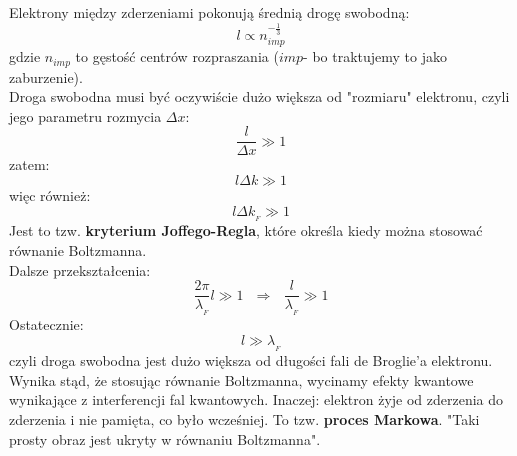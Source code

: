Elektrony między zderzeniami pokonują średnią drogę swobodną:
\begin{equation}l \propto n^{-\frac{1}{3}}_{imp} \end{equation}
gdzie $n_{imp}$ to gęstość centrów rozpraszania ($imp$- bo traktujemy to jako zaburzenie).\\
Droga swobodna musi być oczywiście dużo większa od "rozmiaru" elektronu, czyli jego parametru rozmycia $\Delta x$:
\begin{equation}\frac{l}{\Delta x}\gg 1\end{equation}
zatem:
\begin{equation}l\Delta k \gg 1\end{equation}
więc również:
\begin{equation}l\Delta k_{_F} \gg 1\end{equation}
Jest to tzw.\textbf{ kryterium Joffego-Regla}, które określa kiedy można stosować równanie Boltzmanna.\\
Dalsze przekształcenia:
\begin{equation}\frac{2\pi}{\lambda_{_F}}l\gg 1~~~ \Rightarrow~~~ \frac{l}{\lambda_{_F}}\gg 1\end{equation}
Ostatecznie:
\begin{equation}l \gg \lambda_{_F}\end{equation}
czyli droga swobodna jest dużo większa od długości fali de Broglie'a elektronu. Wynika stąd, że stosując równanie Boltzmanna, wycinamy efekty kwantowe wynikające z interferencji fal kwantowych. Inaczej: elektron żyje od zderzenia do zderzenia i nie pamięta, co było wcześniej. To tzw. \textbf{proces Markowa}. "Taki prosty obraz jest ukryty w równaniu Boltzmanna".
